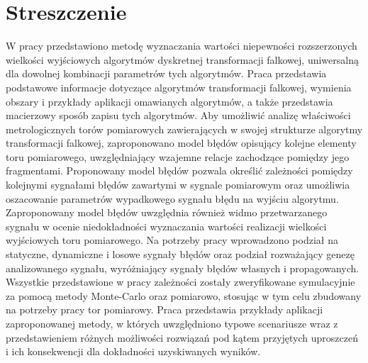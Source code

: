 \chapter*{Streszczenie}

W pracy przedstawiono metodę wyznaczania wartości niepewności rozszerzonych wielkości wyjściowych algorytmów dyskretnej transformacji falkowej, uniwersalną dla dowolnej kombinacji parametrów tych algorytmów. Praca przedstawia podstawowe informacje dotyczące algorytmów transformacji falkowej, wymienia obszary i przykłady aplikacji omawianych algorytmów, a także przedstawia macierzowy sposób zapisu tych algorytmów. Aby umożliwić analizę właściwości metrologicznych torów pomiarowych zawierających w swojej strukturze algorytmy transformacji falkowej, zaproponowano model błędów opisujący kolejne elementy toru pomiarowego, uwzględniający wzajemne relacje zachodzące pomiędzy jego fragmentami. Proponowany model błędów pozwala określić zależności pomiędzy kolejnymi sygnałami błędów zawartymi w sygnale pomiarowym oraz umożliwia oszacowanie parametrów wypadkowego sygnału błędu na wyjściu algorytmu. Zaproponowany model błędów uwzględnia również widmo przetwarzanego sygnału w ocenie niedokładności wyznaczania wartości realizacji wielkości wyjściowych toru pomiarowego. Na potrzeby pracy wprowadzono podział na statyczne, dynamiczne i losowe sygnały błędów oraz podział rozważający genezę analizowanego sygnału, wyróżniający sygnały błędów własnych i propagowanych. Wszystkie przedstawione w pracy zależności zostały zweryfikowane symulacyjnie za pomocą metody Monte-Carlo oraz pomiarowo, stosując w tym celu zbudowany na potrzeby pracy tor pomiarowy. Praca przedstawia przykłady aplikacji zaproponowanej metody, w których uwzględniono typowe scenariusze wraz z przedstawieniem różnych możliwości rozwiązań pod kątem przyjętych uproszczeń i ich konsekwencji dla dokładności uzyskiwanych wyników.
